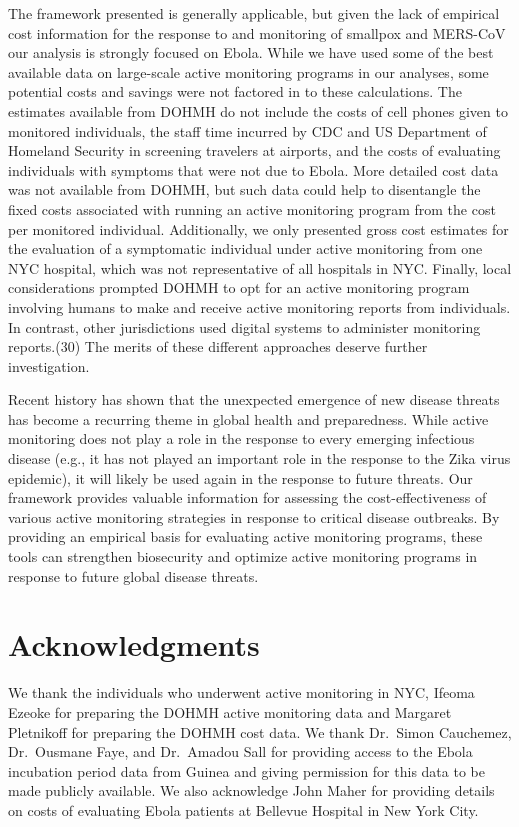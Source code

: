\documentclass[]{article}
\begin{document}
The framework presented is generally applicable, but given the lack of
empirical cost information for the response to and monitoring of
smallpox and MERS-CoV our analysis is strongly focused on Ebola. While
we have used some of the best available data on large-scale active
monitoring programs in our analyses, some potential costs and savings
were not factored in to these calculations. The estimates available from
DOHMH do not include the costs of cell phones given to monitored
individuals, the staff time incurred by CDC and US Department of
Homeland Security in screening travelers at airports, and the costs of
evaluating individuals with symptoms that were not due to Ebola. More
detailed cost data was not available from DOHMH, but such data could
help to disentangle the fixed costs associated with running an active
monitoring program from the cost per monitored individual. Additionally,
we only presented gross cost estimates for the evaluation of a
symptomatic individual under active monitoring from one NYC hospital,
which was not representative of all hospitals in NYC. Finally, local
considerations prompted DOHMH to opt for an active monitoring program
involving humans to make and receive active monitoring reports from
individuals. In contrast, other jurisdictions used digital systems to
administer monitoring reports.(30) The merits of these different
approaches deserve further investigation.

Recent history has shown that the unexpected emergence of new disease
threats has become a recurring theme in global health and preparedness.
While active monitoring does not play a role in the response to every
emerging infectious disease (e.g., it has not played an important role
in the response to the Zika virus epidemic), it will likely be used
again in the response to future threats. Our framework provides valuable
information for assessing the cost-effectiveness of various active
monitoring strategies in response to critical disease outbreaks. By
providing an empirical basis for evaluating active monitoring programs,
these tools can strengthen biosecurity and optimize active monitoring
programs in response to future global disease threats.

\section{Acknowledgments}\label{acknowledgments}

We thank the individuals who underwent active monitoring in NYC, Ifeoma
Ezeoke for preparing the DOHMH active monitoring data and Margaret
Pletnikoff for preparing the DOHMH cost data. We thank Dr.~Simon
Cauchemez, Dr.~Ousmane Faye, and Dr.~Amadou Sall for providing access to
the Ebola incubation period data from Guinea and giving permission for
this data to be made publicly available. We also acknowledge John Maher
for providing details on costs of evaluating Ebola patients at Bellevue
Hospital in New York City.
\end{document}
